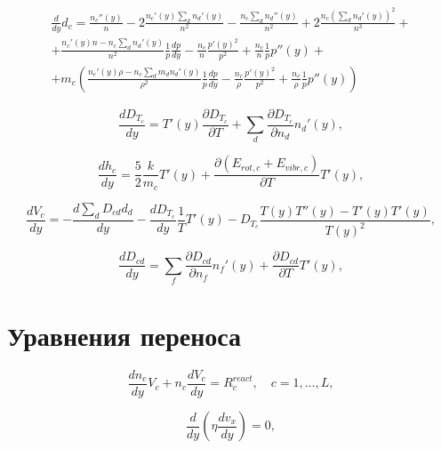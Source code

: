 \documentclass[12pt]{article}
\begin{document}
\begin{multline}
  \frac{d}{dy}d_{c} = \frac{n_{c}''(y)}{n} - 2\frac{n_{c}'(y)\sum_{d}n_{d}'(y)}{n^2} - \frac{n_{c}\sum_{d}n_{d}''(y)}{n^2} + 2\frac{n_{c}\left(\sum_{d}n_{d}'(y) \right)^2}{n^3} + \\
  + \frac{n_{c}'(y)n - n_{c}\sum_{d}n_{d}'(y)}{n^2} \frac{1}{p} \frac{dp}{dy} - \frac{n_{c}}{n} \frac{p'(y)^2}{p^2} + \frac{n_{c}}{n} \frac{1}{p}p''(y) + \\
  + m_{c} \left(\frac{n_{c}'(y)\rho - n_{c}\sum_{d}m_{d}n_{d}'(y)}{\rho^2} \frac{1}{p} \frac{dp}{dy} - \frac{n_{c}}{\rho} \frac{p'(y)^2}{p^2} + \frac{n_{c}}{\rho} \frac{1}{p}p''(y) \right)
\end{multline}

\begin{equation}
  \frac{d D_{T_{c}}}{d y} = T'(y) \frac{\partial D_{T_{c}}}{\partial T} + \sum_{d} \frac{\partial D_{T_{c}}}{\partial n_{d}} n_{d}'(y),
\end{equation}

\begin{equation}
  \frac{d h_{c}}{d y} = \frac{5}{2} \frac{k}{m_{c}}T'(y) + \frac{\partial \left(E_{rot,c} + E_{vibr,c} \right)}{\partial T}T'(y),
\end{equation}

\begin{equation}
  \frac{d V_{c}}{dy} = -\frac{d \sum_{d}D_{cd}d_{d}}{dy} - \frac{d D_{T_{c}}}{d y} \frac{1}{T} T'(y) - D_{T_{c}} \frac{T(y)T''(y) - T'(y)T'(y)}{T(y)^2},
\end{equation}

\begin{equation}
  \frac{d D_{cd}}{dy} = \sum_{f}\frac{\partial D_{cd}}{\partial n_{f}}n_{f}'(y) + \frac{\partial D_{cd}}{\partial T}T'(y),
\end{equation}

\section{Уравнения переноса}

\begin{equation}
  \frac{d n_{c}}{d y} V_{c} + n_{c}\frac{d V_{c}}{d y} = R_{c}^{react},\quad c=1,\ldots,L,\label{densityeqn}
\end{equation}

\begin{equation}
  \frac{d}{d y}\left(\eta \frac{d v_{x}}{d y} \right) = 0,\label{motioneqn}
\end{equation}
\end{document}
